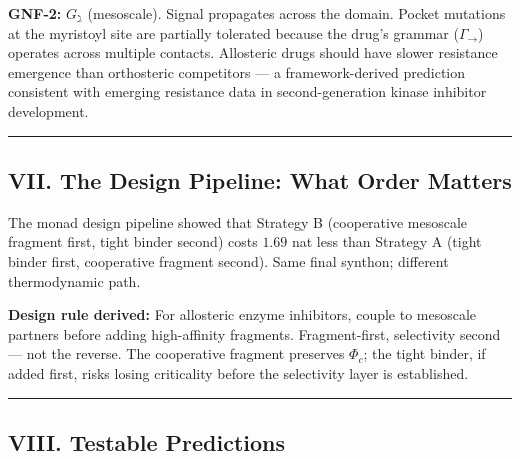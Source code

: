 \documentclass[12pt,a4paper]{article}
\begin{document}
\textbf{GNF-2:} $G_\gimel$ (mesoscale). Signal propagates across the domain. Pocket mutations at the myristoyl site are partially tolerated because the drug's grammar ($\Gamma_\to$) operates across multiple contacts. Allosteric drugs should have slower resistance emergence than orthosteric competitors --- a framework-derived prediction consistent with emerging resistance data in second-generation kinase inhibitor development.

\begin{center}
\rule{0.5\textwidth}{0.4pt}
\end{center}

\subsection{VII. The Design Pipeline: What Order Matters}

The monad design pipeline showed that Strategy B (cooperative mesoscale fragment first, tight binder second) costs $1.69$ nat less than Strategy A (tight binder first, cooperative fragment second). Same final synthon; different thermodynamic path.

\textbf{Design rule derived:} For allosteric enzyme inhibitors, couple to mesoscale partners before adding high-affinity fragments. Fragment-first, selectivity second --- not the reverse. The cooperative fragment preserves $\Phi_c$; the tight binder, if added first, risks losing criticality before the selectivity layer is established.

\begin{center}
\rule{0.5\textwidth}{0.4pt}
\end{center}

\subsection{VIII. Testable Predictions}
\end{document}

